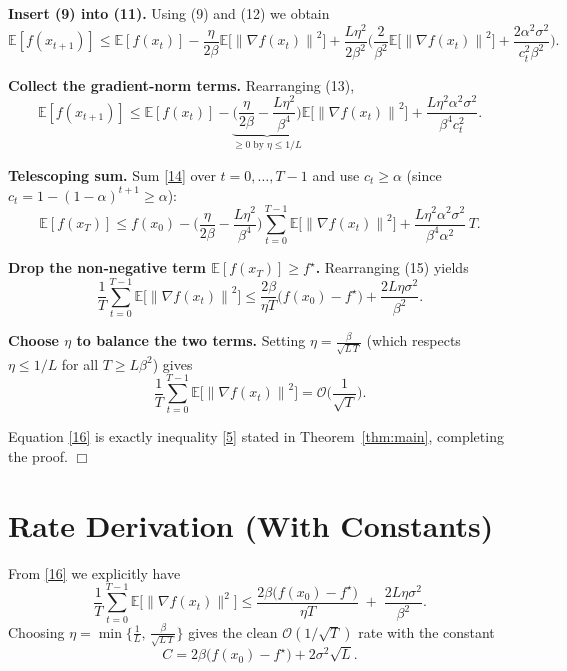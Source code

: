 \documentclass{article}
\newcommand{\EE}{\mathbb{E}}
\newcommand{\norm}[1]{\left\|#1\right\|}
\newcommand{\grad}{\nabla}
\begin{document}
\begin{enumerate}[label={[\textbf{Step \arabic*.}]}, leftmargin=*]
\item \textbf{Insert (9) into (11).}  
Using (9) and (12) we obtain
\[
\EE[f(x_{t+1})]\le
\EE[f(x_t)]
-\frac{\eta}{2\beta}\EE\!\big[\norm{\grad f(x_t)}^{2}\big]
+\frac{L\eta^{2}}{2\beta^{2}}
\Bigg(
\frac{2}{\beta^{2}}\EE\!\big[\norm{\grad f(x_t)}^{2}\big]
+\frac{2\alpha^{2}\sigma^{2}}{c_t^{2}\beta^{2}}
\Bigg).
\tag{13}
\]

\item \textbf{Collect the gradient‑norm terms.}  
Rearranging (13),
\[
\EE[f(x_{t+1})]\le
\EE[f(x_t)]
-\underbrace{\Bigg(\frac{\eta}{2\beta}
      -\frac{L\eta^{2}}{\beta^{4}}\Bigg)}_{\displaystyle\ge0\;\text{by }\eta\le1/L}
      \EE\!\big[\norm{\grad f(x_t)}^{2}\big]
+\frac{L\eta^{2}\alpha^{2}\sigma^{2}}{\beta^{4}c_t^{2}} .
\tag{14}
\]

\item \textbf{Telescoping sum.}  
Sum \eqref{14} over $t=0,\dots,T-1$ and use $c_t\ge\alpha$ (since $c_t=1-(1-\alpha)^{t+1}\ge\alpha$):
\[
\EE[f(x_T)]\le f(x_0)
-\Bigg(\frac{\eta}{2\beta}
      -\frac{L\eta^{2}}{\beta^{4}}\Bigg)
      \sum_{t=0}^{T-1}\EE\!\big[\norm{\grad f(x_t)}^{2}\big]
+\frac{L\eta^{2}\alpha^{2}\sigma^{2}}{\beta^{4}\alpha^{2}}\,T .
\tag{15}
\]

\item \textbf{Drop the non‑negative term $\EE[f(x_T)]\ge f^{\star}$.}  
Rearranging (15) yields
\[
\frac{1}{T}\sum_{t=0}^{T-1}\EE\!\big[\norm{\grad f(x_t)}^{2}\big]
\le
\frac{2\beta}{\eta T}\big(f(x_0)-f^{\star}\big)
   +\frac{2L\eta\sigma^{2}}{\beta^{2}} .
\tag{16}
\]

\item \textbf{Choose $\eta$ to balance the two terms.}  
Setting $\eta=\frac{\beta}{\sqrt{L\,T}}$ (which respects $\eta\le1/L$ for all $T\ge L\beta^{2}$) gives
\[
\frac{1}{T}\sum_{t=0}^{T-1}\EE\!\big[\norm{\grad f(x_t)}^{2}\big]
 =\mathcal O\!\Big(\frac{1}{\sqrt{T}}\Big).
\tag{17}
\]

\end{enumerate}
Equation \eqref{16} is exactly inequality \eqref{5} stated in Theorem~\ref{thm:main}, completing the proof. \hfill\(\Box\)

\section*{Rate Derivation (With Constants)}
From \eqref{16} we explicitly have
\[
\boxed{
\frac{1}{T}\sum_{t=0}^{T-1}\EE\!\big[\|\grad f(x_t)\|^{2}\big]
\le
\frac{2\beta\big(f(x_0)-f^{\star}\big)}{\eta T}
\;+\;
\frac{2L\eta\sigma^{2}}{\beta^{2}} } .
\]
Choosing $\eta=\min\Big\{\frac{1}{L},\,\frac{\beta}{\sqrt{L\,T}}\Big\}$ gives the clean $\mathcal O(1/\sqrt{T})$ rate with the constant
\[
C = 2\beta\big(f(x_0)-f^{\star}\big)+2\sigma^{2}\sqrt{L}.
\]
\end{document}
